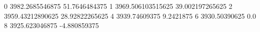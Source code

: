 0 3982.2685546875 51.7646484375
1 3969.506103515625 39.002197265625
2 3959.43212890625 28.92822265625
4 3939.74609375 9.2421875
6 3930.50390625 0.0
8 3925.623046875 -4.880859375
